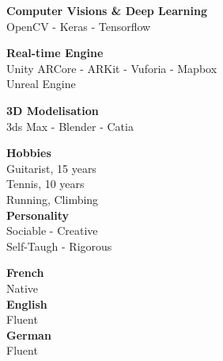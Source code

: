 \documentclass[9pt]{developercv} %
\begin{document}
\vspace{0.5cm}



\begin{minipage}[t]{0.35\textwidth}
	\vspace{-\baselineskip} %
	
	
	\textbf{Computer Visions \& Deep Learning} \\ 
	OpenCV - Keras - Tensorflow
	
	\textbf{Real-time Engine} \\ 
	Unity ARCore - ARKit - Vuforia - Mapbox \\
	Unreal Engine
	
	\textbf{3D Modelisation} \\ 
	3ds Max - Blender - Catia
	

	

	
	
	
	
\end{minipage}
\hfill
\begin{minipage}[t]{0.2\textwidth}
	\vspace{-\baselineskip} %
	
	
	\textbf{Hobbies} \\
	Guitarist, 15 years \\
	Tennis, 10 years \\
	Running, Climbing \\
	\textbf{Personality} \\
	Sociable - Creative \\
	Self-Taugh - Rigorous 
\end{minipage}
\hfill
\begin{minipage}[t]{0.2\textwidth}
	\vspace{-\baselineskip} %

	
	\textbf{French} \\
	Native \\
	\textbf{English} \\
	Fluent \\
	\textbf{German} \\ 
	Fluent
\end{minipage}
\hfill




\end{document}
